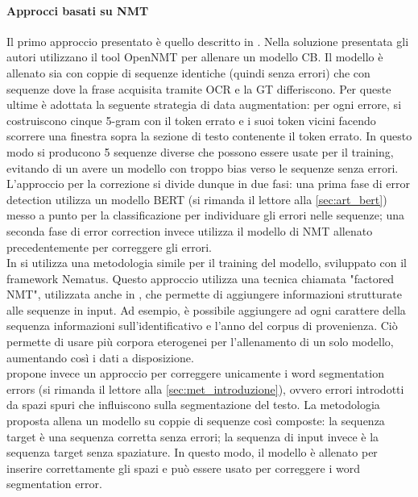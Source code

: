 \paragraph{Approcci basati su NMT}
Il primo approccio presentato è quello descritto in \cite{nguyen2020neural}. Nella soluzione presentata gli autori utilizzano il tool OpenNMT\cite{klein2017opennmt} per allenare un modello CB. Il modello è allenato sia con coppie di sequenze identiche (quindi senza errori) che con sequenze dove la frase acquisita tramite OCR e la GT differiscono. Per queste ultime è adottata la seguente strategia di data augmentation: per ogni errore, si costruiscono cinque 5-gram con il token errato e i suoi token vicini facendo scorrere una finestra sopra la sezione di testo contenente il token errato. In questo modo si producono 5 sequenze diverse che possono essere usate per il training, evitando di un avere un modello con troppo bias verso le sequenze senza errori. L'approccio per la correzione si divide dunque in due fasi: una prima fase di error detection utilizza un modello BERT (si rimanda il lettore alla \autoref{sec:art_bert}) messo a punto per la classificazione per individuare gli errori nelle sequenze; una seconda fase di error correction invece utilizza il modello di NMT allenato precedentemente per correggere gli errori.\\
In \cite{amrhein2018supervised} si utilizza una metodologia simile per il training del modello, sviluppato con il framework Nematus\cite{sennrich2017nematus}. Questo approccio utilizza una tecnica chiamata "factored NMT", utilizzata anche in \cite{nguyen2020neural}, che permette di aggiungere informazioni strutturate alle sequenze in input. Ad esempio, è possibile aggiungere ad ogni carattere della sequenza informazioni sull'identificativo e l'anno del corpus di provenienza. Ciò permette di usare più corpora eterogenei per l'allenamento di un solo modello, aumentando così i dati a disposizione.\\
\cite{nastase2018correction} propone invece un approccio per correggere unicamente i word segmentation errors (si rimanda il lettore alla \autoref{sec:met_introduzione}), ovvero errori introdotti da spazi spuri che influiscono sulla segmentazione del testo. La metodologia proposta allena un modello su coppie di sequenze così composte: la sequenza target è una sequenza corretta senza errori; la sequenza di input invece è la sequenza target senza spaziature. In questo modo, il modello è allenato per inserire correttamente gli spazi e può essere usato per correggere i word segmentation error.\\
